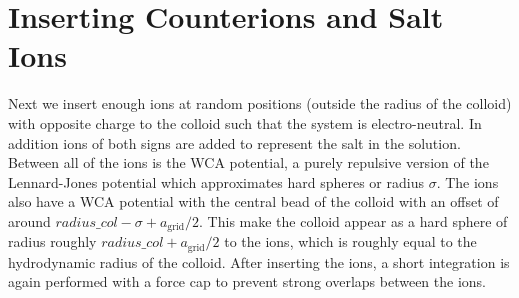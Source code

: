 \documentclass[
paper=a4,                       %
fontsize=11pt,                  %
twoside,                        %
footsepline,                    %
headsepline,                    %
headinclude=false,              %
footinclude=false,              %
pagesize,                       %
]{scrartcl}
\begin{document}
\section{Inserting Counterions and Salt Ions}

Next we insert enough ions at random positions (outside the radius of the colloid) with opposite charge to the colloid such that the system is electro-neutral. In addition ions
of both signs are added to represent the salt in the solution. Between all of the ions is the WCA potential, a purely repulsive
version of the Lennard-Jones potential which approximates hard spheres or radius $\sigma$. The ions also have a WCA potential
with the central bead of the colloid with an offset of around $radius\_col-\sigma +a_\mathrm{grid}/2$. This make
the colloid appear as a hard sphere of radius roughly $radius\_col+a_\mathrm{grid}/2$ to the ions, which is roughly equal to the
hydrodynamic radius of the colloid. After inserting the ions, a short integration is again performed with a force cap to
prevent strong overlaps between the ions.
\end{document}
